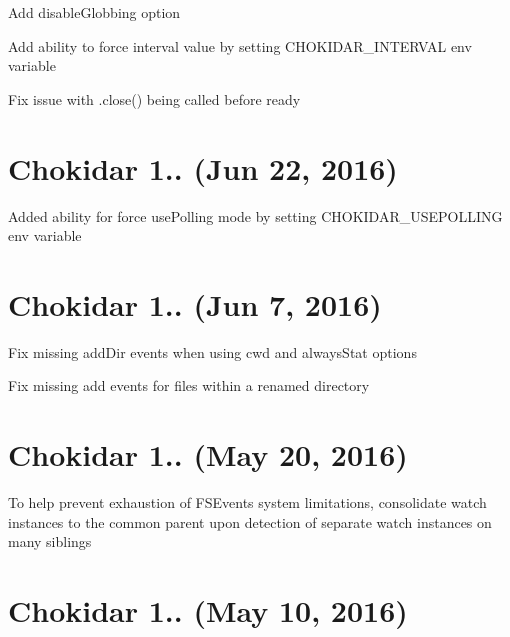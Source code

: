 
\begin{DoxyItemize}
\item Add {\ttfamily disable\+Globbing} option
\item Add ability to force interval value by setting C\+H\+O\+K\+I\+D\+A\+R\+\_\+\+I\+N\+T\+E\+R\+V\+AL env variable
\item Fix issue with {\ttfamily .close()} being called before {\ttfamily ready}
\end{DoxyItemize}

\section*{Chokidar 1.. (Jun 22, 2016)}


\begin{DoxyItemize}
\item Added ability for force {\ttfamily use\+Polling} mode by setting {\ttfamily C\+H\+O\+K\+I\+D\+A\+R\+\_\+\+U\+S\+E\+P\+O\+L\+L\+I\+NG} env variable
\end{DoxyItemize}

\section*{Chokidar 1.. (Jun 7, 2016)}


\begin{DoxyItemize}
\item Fix missing {\ttfamily add\+Dir} events when using {\ttfamily cwd} and {\ttfamily always\+Stat} options
\item Fix missing {\ttfamily add} events for files within a renamed directory
\end{DoxyItemize}

\section*{Chokidar 1.. (May 20, 2016)}


\begin{DoxyItemize}
\item To help prevent exhaustion of F\+S\+Events system limitations, consolidate watch instances to the common parent upon detection of separate watch instances on many siblings
\end{DoxyItemize}

\section*{Chokidar 1.. (May 10, 2016)}


